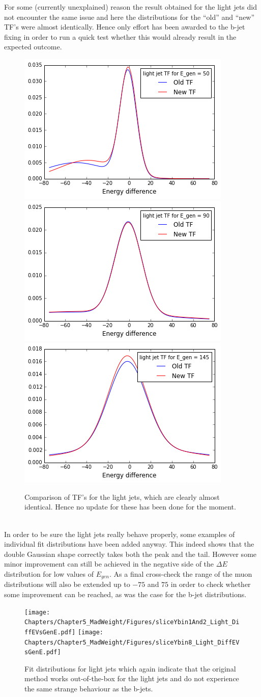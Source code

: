 For some (currently unexplained) reason the result obtained for the light jets did not encounter the same issue and here the distributions for the ``old'' and ``new'' TF's were almost identically. Hence only effort has been awarded to the b-jet fixing in order to run a quick test whether this would already result in the expected outcome.
\begin{figure}[h!t]
 \centering
 \includegraphics[width = 0.3 \textwidth]{Chapters/Chapter5_MadWeight/Figures/LightTF_OldvsNew_Egen50.png}
 \includegraphics[width = 0.3 \textwidth]{Chapters/Chapter5_MadWeight/Figures/LightTF_OldvsNew_Egen90.png}
 \includegraphics[width = 0.3 \textwidth]{Chapters/Chapter5_MadWeight/Figures/LightTF_OldvsNew_Egen145.png}
 \caption{Comparison of TF's for the light jets, which are clearly almost identical. Hence no update for these has been done for the moment.}
\end{figure}
\hfill \\
In order to be sure the light jets really behave properly, some examples of individual fit distributions have been added anyway. This indeed shows that the double Gaussian shape correctly takes both the peak and the tail. However some minor improvement can still be achieved in the negative side of the $\Delta E$ distribution for low values of $E_{gen}$. As a final cross-check the range of the muon distributions will also be extended up to $-75$ and $75$ in order to check whether some improvement can be reached, as was the case for the b-jet distributions.
\begin{figure}[h!t]
 \centering
 \texttt{[image: Chapters/Chapter5\_MadWeight/Figures/sliceYbin1And2\_Light\_DiffEVsGenE.pdf]}
 \texttt{[image: Chapters/Chapter5\_MadWeight/Figures/sliceYbin8\_Light\_DiffEVsGenE.pdf]}
 \caption{Fit distributions for light jets which again indicate that the original method works out-of-the-box for the light jets and do not experience the same strange behaviour as the b-jets.}
\end{figure}

